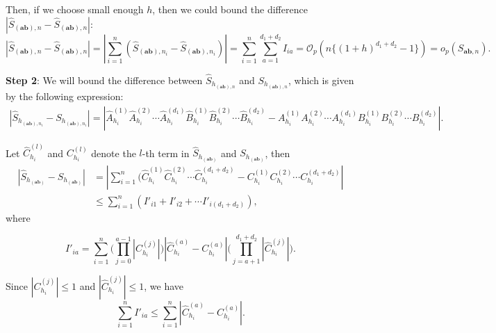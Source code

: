 \documentclass[12pt,reqno,oneside]{amsbook}
\theoremstyle{definition}
\theoremstyle{remark}
\begin{document}
Then, if we choose small enough $h$, then we could bound the difference $|\hat{S}_{(\mathbf{ab}),n} - \hat{S}_{(\mathbf{ab}),n}|$:
$$|\hat{S}_{(\mathbf{ab}),n} - \hat{S}_{(\mathbf{ab}),n}|=|\sum_{i=1}^{n} (\hat{S}_{(\mathbf{ab}),n_i} - \hat{S}_{(\mathbf{ab}),n_i})| = \sum_{i=1}^{n}\sum_{a=1}^{d_1+d_2} I_{ia}=\mathcal{O}_p\left(n \{(1+h)^{d_1+d_2}-1\} \right)=o_p(S_{\mathbf{ab},n}).$$



\textbf{Step 2}: We will bound the difference between
$\hat{S}_{h_{(\mathbf{ab}),n}}$ and $S_{h_{(\mathbf{ab}),n}}$, which is given by the following expression: 
\begin{align*}
    |\hat{S}_{h_{(\mathbf{ab}),n_i}} - S_{h_{(\mathbf{ab}),n_i}}|
     =| \hat{A}_{{h}_i}^{(1)}\hat{A}_{{h}_i}^{(2)}\cdots \hat{A}_{{h}_i}^{(d_1)} \hat{B}_{{h}_i}^{(1)} \hat{B}_{{h}_i}^{(2)}\cdots \hat{B}_{{h}_i}^{(d_2)}-A_{{h}_i}^{(1)}A_{{h}_i}^{(2)}\cdots A_{{h}_i}^{(d_1)}B_{{h}_i}^{(1)}B_{{h}_i}^{(2)}\cdots B_{{h}_i}^{(d_2)} |. 
\end{align*}

Let $\hat{C}_{{h}_i}^{(l)}$ and $C_{{h}_i}^{(l)}$ denote the $l$-th term in $\hat{S}_{h_{(\mathbf{ab})}}$ and $S_{h_{(\mathbf{ab})}}$, then
\begin{align*}
     |\hat{S}_{h_{(\mathbf{ab})}}-S_{h_{(\mathbf{ab})}}| 
     &=|\sum_{i=1}^{n}(\hat{C}_{{h}_i}^{(1)}\hat{C}_{{h}_i}^{(2)}\cdots\hat{C}_{{h}_i}^{(d_1+d_2)}-C_{{h}_i}^{(1)}C_{{h}_i}^{(2)}\cdots C_{{h}_i}^{(d_1+d_2)} | 
      \\
      & \le  \sum_{i=1}^{n}(I'_{i1} + I'_{i2} + \cdots I'_{i(d_1+d_2)}),
\end{align*}
where 

$$
I'_{ia} = 
\sum_{i=1}^{n}\Big(\prod_{j=0}^{a-1} |C_{h_i}^{(j)}|\Big)|\hat{C}_{h_i}^{(a)}-{C}^{(a)}_{h_i}| 
\Big(\prod_{j=a+1}^{d_1+d_2} |\hat{C}_{h_i}^{(j)}|\Big).$$

 

Since $|C_{{h}_i}^{(j)}|\leq 1$ and $|\hat{C}_{{h}_i}^{(j)}|\leq 1$, we have 
$$
\sum_{i=1}^{n} I'_{ia} \leq  \sum_{i=1}^{n}|\hat{C}_{h_i}^{(a)}-{C}^{(a)}_{h_i}|.
$$
\end{document}
